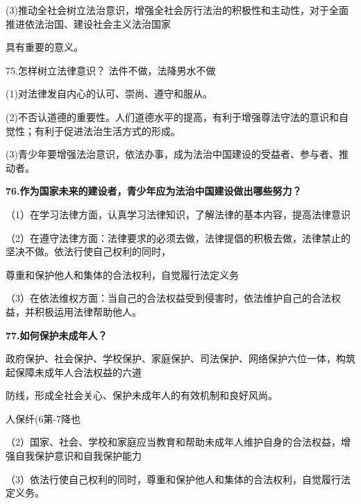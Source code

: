 \documentclass[lang=cn,11pt]{elegantbook}
\begin{document}
(3)推动全社会树立法治意识，增强全社会厉行法治的积极性和主动性，对于全面推进依法治国、建设社会主义法治国家\par

具有重要的意义。\par

75.怎样树立法律意识？ 法件不做，法降男水不做\par

(1)对法律发自内心的认可、崇尚、遵守和服从。\par

(2)不否认道德的重要性。人们道德水平的提高，有利于增强尊法守法的意识和自觉性；有利于促进法治生活方式的形成。\par

(3)青少年要增强法治意识，依法办事，成为法治中国建设的受益者、参与者、推动者。\par

\textbf{76.作为国家未来的建设者，青少年应为法治中国建设做出哪些努力？}\par

（1）在学习法律方面，认真学习法律知识，了解法律的基本内容，提高法律意识\par

（2）在遵守法律方面：法律要求的必须去做，法律提倡的积极去做，法律禁止的坚决不做。依法行使自己权利的同时，\par

尊重和保护他人和集体的合法权利，自觉履行法定义务\par

（3）在依法维权方面：当自己的合法权益受到侵害时，依法维护自己的合法权益，并积极运用法律帮助他人。\par

\textbf{77.如何保护未成年人？}\par

政府保护、社会保护、学校保护、家庭保护、司法保护、网络保护六位一体，构筑起保障未成年人合法权益的六道\par

防线，形成全社会关心、保护未成年人的有效机制和良好风尚。\par

人保纤(6第-7降也\par

（2）国家、社会、学校和家庭应当教育和帮助未成年人维护自身的合法权益，增强自我保护意识和自我保护能力\par

（3）依法行使自己权利的同时，尊重和保护他人和集体的合法权利，自觉履行法定义务。\par
\end{document}
